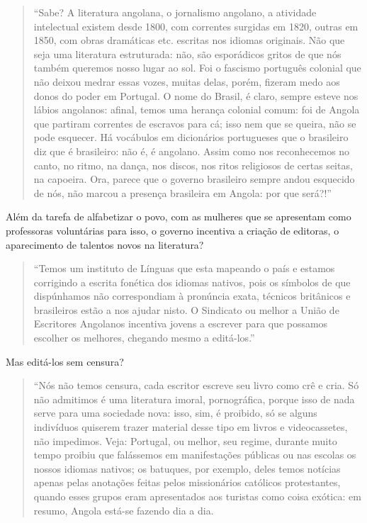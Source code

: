 \documentclass[
  letterpaper,
  DIV=11,
  numbers=noendperiod]{scrreprt}
\begin{document}
\begin{quote}
``Sabe? A literatura angolana, o jornalismo angolano, a atividade
intelectual existem desde 1800, com correntes surgidas em 1820, outras
em 1850, com obras dramáticas etc. escritas nos idiomas originais. Não
que seja uma literatura estruturada: não, são esporádicos gritos de que
nós também queremos nosso lugar ao sol. Foi o fascismo português
colonial que não deixou medrar essas vozes, muitas delas, porém, fizeram
medo aos donos do poder em Portugal. O nome do Brasil, é claro, sempre
esteve nos lábios angolanos: afinal, temos uma herança colonial comum:
foi de Angola que partiram correntes de escravos para cá; isso nem que
se queira, não se pode esquecer. Há vocábulos em dicionários portugueses
que o brasileiro diz que é brasileiro: não é, é angolano. Assim como nos
reconhecemos no canto, no ritmo, na dança, nos discos, nos ritos
religiosos de certas seitas, na capoeira. Ora, parece que o governo
brasileiro sempre andou esquecido de nós, não marcou a presença
brasileira em Angola: por que será?!''
\end{quote}

Além da tarefa de alfabetizar o povo, com as mulheres que se apresentam
como professoras voluntárias para isso, o governo incentiva a criação de
editoras, o aparecimento de talentos novos na literatura?

\begin{quote}
``Temos um instituto de Línguas que esta mapeando o país e estamos
corrigindo a escrita fonética dos idiomas nativos, pois os símbolos de
que dispúnhamos não correspondiam à pronúncia exata, técnicos britânicos
e brasileiros estão a nos ajudar nisto. O Sindicato ou melhor a União de
Escritores Angolanos incentiva jovens a escrever para que possamos
escolher os melhores, chegando mesmo a editá-los.''
\end{quote}

Mas editá-los sem censura?

\begin{quote}
``Nós não temos censura, cada escritor escreve seu livro como crê e
cria. Só não admitimos é uma literatura imoral, pornográfica, porque
isso de nada serve para uma sociedade nova: isso, sim, é proibido, só se
alguns indivíduos quiserem trazer material desse tipo em livros e
videocassetes, não impedimos. Veja: Portugal, ou melhor, seu regime,
durante muito tempo proibiu que falássemos em manifestações públicas ou
nas escolas os nossos idiomas nativos; os batuques, por exemplo, deles
temos notícias apenas pelas anotações feitas pelos missionários
católicos protestantes, quando esses grupos eram apresentados aos
turistas como coisa exótica: em resumo, Angola está-se fazendo dia a
dia.
\end{quote}
\end{document}
